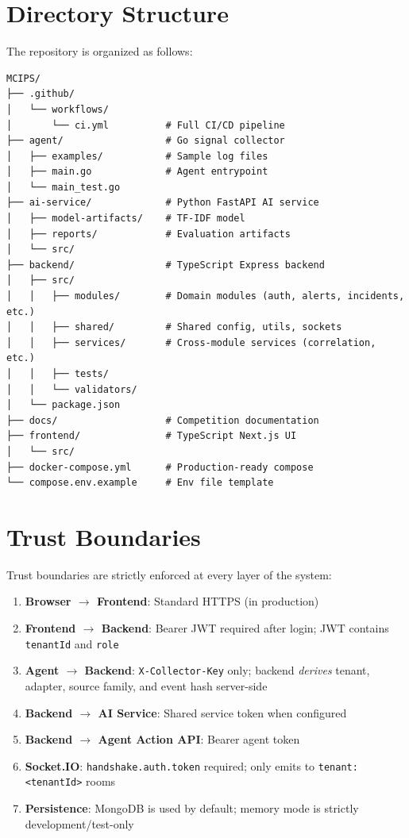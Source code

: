 \documentclass[12pt,a4paper,twoside]{report}
\begin{document}
\section{Directory Structure}
The repository is organized as follows:
\begin{verbatim}
MCIPS/
├── .github/
│   └── workflows/
│       └── ci.yml          # Full CI/CD pipeline
├── agent/                  # Go signal collector
│   ├── examples/           # Sample log files
│   ├── main.go             # Agent entrypoint
│   └── main_test.go
├── ai-service/             # Python FastAPI AI service
│   ├── model-artifacts/    # TF-IDF model
│   ├── reports/            # Evaluation artifacts
│   └── src/
├── backend/                # TypeScript Express backend
│   ├── src/
│   │   ├── modules/        # Domain modules (auth, alerts, incidents, etc.)
│   │   ├── shared/         # Shared config, utils, sockets
│   │   ├── services/       # Cross-module services (correlation, etc.)
│   │   ├── tests/
│   │   └── validators/
│   └── package.json
├── docs/                   # Competition documentation
├── frontend/               # TypeScript Next.js UI
│   └── src/
├── docker-compose.yml      # Production-ready compose
└── compose.env.example     # Env file template
\end{verbatim}

\section{Trust Boundaries}
\label{sec:trust}
Trust boundaries are strictly enforced at every layer of the system:
\begin{enumerate}[label=(\alph*)]
    \item \textbf{Browser $\to$ Frontend}: Standard HTTPS (in production)
    \item \textbf{Frontend $\to$ Backend}: Bearer JWT required after login; JWT contains \texttt{tenantId} and \texttt{role}
    \item \textbf{Agent $\to$ Backend}: \texttt{X-Collector-Key} only; backend \textit{derives} tenant, adapter, source family, and event hash server-side
    \item \textbf{Backend $\to$ AI Service}: Shared service token when configured
    \item \textbf{Backend $\to$ Agent Action API}: Bearer agent token
    \item \textbf{Socket.IO}: \texttt{handshake.auth.token} required; only emits to \texttt{tenant:<tenantId>} rooms
    \item \textbf{Persistence}: MongoDB is used by default; memory mode is strictly development/test-only
\end{enumerate}
\end{document}
